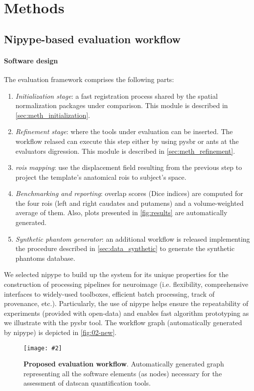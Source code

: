 \documentclass{frontiers}
\newcommand{\insertgraphic}[2]{\texttt{[image: \#2]}}
\newcommand{\insertgraphic}[2]{\texttt{[image: \#2]}}
\newcommand{\emitem}[1]{\item \emph{#1}}
\begin{document}
\section{Methods}
\label{sec:methods}

\subsection{Nipype-based evaluation workflow}
\label{sec:evaluation}
\paragraph{Software design}\label{sec:workflow}
The evaluation framework comprises the following parts: 
\begin{enumerate}
\emitem{Initialization stage}: a fast registration process shared by the
  spatial normalization packages under comparison. This module is described
  in \autoref{sec:meth_initialization}.
\emitem{Refinement stage}: where the tools under evaluation can be inserted.
  The workflow relased can execute this step either by using \gls*{pysbr} 
  or \gls*{ants} at the evaluators digression. This module is described
  in \autoref{sec:meth_refinement}.
\emitem{\Glspl{roi} mapping}: use the displacement field resulting from
  the previous step to project the template's anatomical \glspl*{roi} to
  subject's space.
\emitem{Benchmarking and reporting}: overlap scores (Dice indices) are
  computed for the four \glspl*{roi} (left and right caudates and putamens)
  and a volume-weighted average of them. Also, plots presented in
  \autoref{fig:results} are automatically generated.
\emitem{Synthetic phantom generator}: an additional workflow is released
  implementing the procedure described in \autoref{sec:data_synthetic} to
  generate the synthetic phantoms database.
\end{enumerate}
We selected \gls*{nipype} to build up the system for its unique properties for
  the construction of processing pipelines for neuroimage (i.e. flexibility,
  comprehensive interfaces to widely-used toolboxes, efficient batch processing,
  track of provenance, etc.).
Particularly, the use of \gls*{nipype} helps ensure the repeatability of
  experiments (provided with open-data) and enables fast algorithm prototyping
  as we illustrate with the \gls*{pysbr} tool.
The workflow graph (automatically generated by \gls*{nipype}) is depicted in 
  \autoref{fig:02-new}.

\begin{figure*}[!ht]
  \centering
    \insertgraphic{width=\linewidth}{figures/04-nipype-workflow}
  \caption{\label{fig:02-new}
  \textbf{Proposed evaluation workflow}. Automatically generated graph 
  representing all the software elements (as nodes) necessary
  for the assessment of \gls*{datscan} quantification tools.}
\end{figure*}
\end{document}
